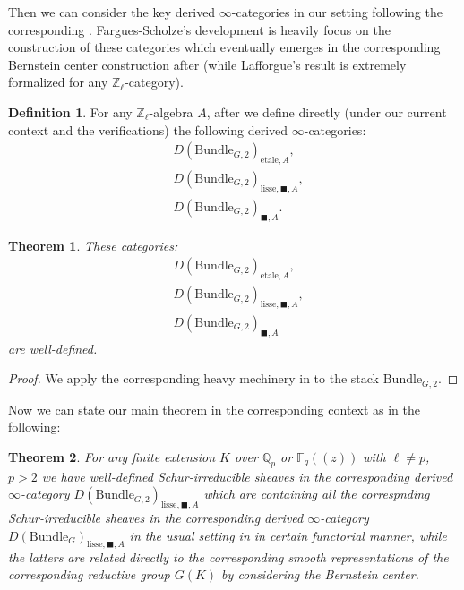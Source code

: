 \documentclass[12pt]{book}
\newtheorem{theorem}{Theorem}
\theoremstyle{definition}
\newtheorem{definition}{Definition}
\begin{document}
\noindent Then we can consider the key derived $\infty$-categories in our setting following the corresponding \cite{FS}. Fargues-Scholze's development is heavily focus on the construction of these categories which eventually emerges in the corresponding Bernstein center construction after \cite{VLa} (while Lafforgue's result is extremely formalized for any $\mathbb{Z}_\ell$-category).


\begin{definition}
For any $\mathbb{Z}_\ell$-algebra $A$, after \cite{FS} we define directly (under our current context and the verifications) the following derived $\infty$-categories:
\begin{align}
&D(\mathrm{Bundle}_{G,2})_{\text{etale},A},\\
&D(\mathrm{Bundle}_{G,2})_{\text{lisse},\blacksquare,A},\\
&D(\mathrm{Bundle}_{G,2})_{\blacksquare,A}.
\end{align}
\end{definition}

\begin{theorem}
These categories:
\begin{align}
&D(\mathrm{Bundle}_{G,2})_{\text{etale},A},\\
&D(\mathrm{Bundle}_{G,2})_{\text{lisse},\blacksquare,A},\\
&D(\mathrm{Bundle}_{G,2})_{\blacksquare,A}
\end{align}
are well-defined.
\end{theorem}

\begin{proof}
We apply the corresponding heavy mechinery in \cite[Chapter V, Chapter VII]{FS} to the stack $\mathrm{Bundle}_{G,2}$.
\end{proof}

Now we can state our main theorem in the corresponding context as in the following:

\begin{theorem}
For any finite extension $K$ over $\mathbb{Q}_p$ or $\mathbb{F}_q((z))$ with $\ell\neq p$, $p>2$ we have well-defined Schur-irreducible sheaves in the corresponding derived $\infty$-category $D(\mathrm{Bundle}_{G,2})_{\text{lisse},\blacksquare,A}$ which are containing all the correspnding Schur-irreducible sheaves in the corresponding derived $\infty$-category $D(\mathrm{Bundle}_{G})_{\text{lisse},\blacksquare,A}$ in the usual setting in \cite{FS} in certain functorial manner, while the latters are related directly to the corresponding smooth representations of the corresponding reductive group $G(K)$ by considering the Bernstein center.
\end{theorem}
\end{document}
